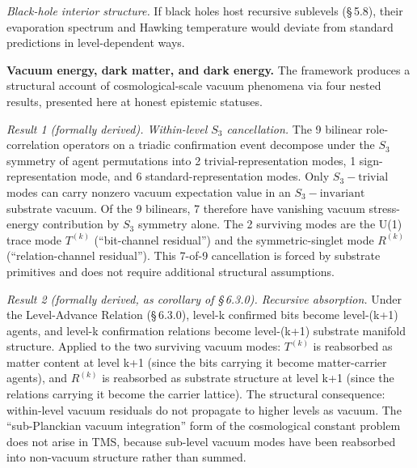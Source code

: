 \documentclass[11pt,oneside]{report}
\theoremstyle{definition}
\theoremstyle{remark}
\begin{document}
\emph{Black-hole interior structure.} If black holes host recursive
sublevels (\S\,5.8), their evaporation spectrum and Hawking temperature
would deviate from standard predictions in level-dependent ways.

\textbf{Vacuum energy, dark matter, and dark energy.} The framework
produces a structural account of cosmological-scale vacuum phenomena via
four nested results, presented here at honest epistemic statuses.

\emph{Result 1 (formally derived). Within-level \ensuremath{S_{3}} cancellation.} The 9
bilinear role-correlation operators on a triadic confirmation event
decompose under the \ensuremath{S_{3}} symmetry of agent permutations into 2
trivial-representation modes, 1 sign-representation mode, and 6
standard-representation modes. Only \ensuremath{S_{3}-\text{trivial}} modes can carry nonzero
vacuum expectation value in an \ensuremath{S_{3}-\text{invariant}} substrate vacuum. Of the 9
bilinears, 7 therefore have vanishing vacuum stress-energy contribution
by \ensuremath{S_{3}} symmetry alone. The 2 surviving modes are the U(1) trace mode
\ensuremath{T^{(k)}} (``bit-channel residual'') and the symmetric-singlet mode
\ensuremath{R^{(k)}} (``relation-channel residual''). This 7-of-9 cancellation is
forced by substrate primitives and does not require additional
structural assumptions.

\emph{Result 2 (formally derived, as corollary of \S\,6.3.0). Recursive
absorption.} Under the Level-Advance Relation (\S\,6.3.0), level-k
confirmed bits become level-(k+1) agents, and level-k confirmation
relations become level-(k+1) substrate manifold structure. Applied to
the two surviving vacuum modes: \ensuremath{T^{(k)}} is reabsorbed as matter content
at level k+1 (since the bits carrying it become matter-carrier agents),
and \ensuremath{R^{(k)}} is reabsorbed as substrate structure at level k+1 (since
the relations carrying it become the carrier lattice). The structural
consequence: within-level vacuum residuals do not propagate to higher
levels as vacuum. The ``sub-Planckian vacuum integration'' form of the
cosmological constant problem does not arise in TMS, because sub-level
vacuum modes have been reabsorbed into non-vacuum structure rather than
summed.
\end{document}
